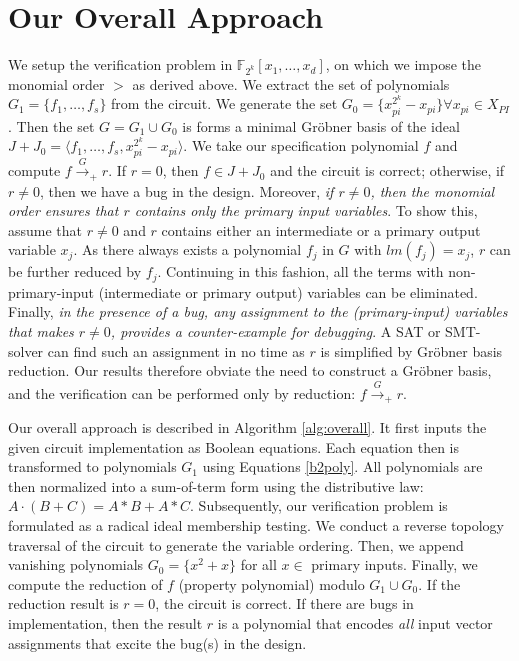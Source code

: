 
\section{Our Overall Approach}\label{sec:all}

We setup the verification problem in $\mathbb{F}_{2^k} [x_1, \dots,
x_d]$, on which we impose the monomial order $>$ as derived above. We
extract the set of polynomials $G_1 = \{f_1, \dots, f_s\}$ from the
circuit. We generate the set $G_0 = \{x_{pi}^{2^k} - x_{pi}\} \forall
x_{pi} \in X_{PI}$. Then the set $G = G_1 \cup G_0$ is forms a minimal
Gr\"obner basis of the ideal $J + J_0 = \langle f_1, \dots, f_s,
x_{pi}^{2^k} - x_{pi}\rangle$. We take our specification polynomial
$f$ and compute $f \stackrel{G}\rightarrow _+r$. If $r = 0$, then $f
\in J + J_0$ and the circuit is correct; otherwise, if $r\neq 0$, then
we have a bug in the design. Moreover, {\it if $r \neq 0$, then the
  monomial order ensures that $r$ contains only the primary input
  variables}. To show this, assume that $r\neq 0$ and $r$ contains
either an intermediate or a primary output variable $x_j$. As there
always exists a polynomial $f_j$ in $G$ with $lm(f_j) = x_j$, $r$ can
be further reduced by $f_j$. Continuing in this fashion, all the terms
with non-primary-input (intermediate or primary output) variables can
be eliminated. Finally, {\it in the presence of a bug, 
any assignment to the (primary-input) variables that makes $r \neq 0$,
provides a counter-example for debugging}. A SAT or SMT-solver
can find such an assignment in no time as $r$ is simplified by
Gr\"obner basis reduction. Our results therefore obviate
the need to construct a Gr\"obner basis, and the verification can be
performed only by reduction: $f \stackrel{G}\rightarrow _+ r$. 


Our overall approach is described in Algorithm \ref{alg:overall}. It
first inputs the given circuit implementation as Boolean
equations. Each equation then is transformed to polynomials $G_1$
using Equations \ref{b2poly}.  All polynomials are then normalized
into a sum-of-term form using the distributive law: $A\cdot(B+C)=A*B+A*C$. 
Subsequently, our verification problem is formulated as a radical
ideal membership testing. We conduct a reverse topology traversal of
the circuit to generate the variable ordering. Then, we append
vanishing polynomials $G_{0} =\{x^2 + x \}$ for all $x \in$ primary
inputs. Finally, we compute the reduction of $f$ (property
polynomial) modulo $G_1 \cup G_{0}$. If the reduction result is $r =
0$, the circuit is correct. If there are bugs in implementation,  then
the result $r$ is a polynomial that encodes {\it all} input vector
assignments that excite the bug(s) in the design. 


